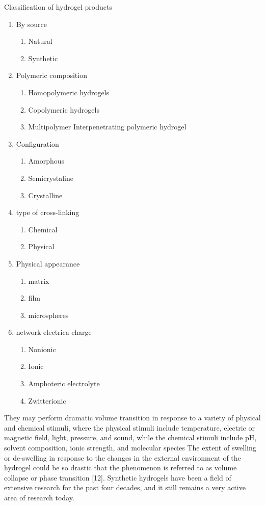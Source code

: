 \documentclass[../../main-notes.tex]{subfiles}
\begin{document}
Classification of hydrogel products 

\begin{enumerate}
    \item By source 
    \begin{enumerate}
        \item Natural
        \item Synthetic
    \end{enumerate}
    \item Polymeric composition
    \begin{enumerate}
        \item Homopolymeric hydrogels 
        \item Copolymeric hydrogels 
        \item Multipolymer Interpenetrating polymeric hydrogel 
    \end{enumerate}
    \item Configuration
    \begin{enumerate}
        \item Amorphous
        \item Semicrystaline 
        \item  Crystalline
    \end{enumerate}
    \item type of cross-linking 
    \begin{enumerate}
        \item Chemical
        \item Physical
    \end{enumerate}
    \item Physical appearance
    \begin{enumerate}
        \item matrix
        \item film
        \item microspheres
    \end{enumerate}
    \item network electrica charge
    \begin{enumerate}
        \item Nonionic
        \item Ionic
        \item Amphoteric electrolyte
        \item Zwitterionic
    \end{enumerate}
\end{enumerate}


They may perform dramatic volume transition in response to a variety of physical and chemical stimuli, where the physical stimuli include temperature, electric or magnetic field, light, pressure, and sound, while the chemical stimuli include pH, solvent composition, ionic strength, and molecular species
The extent of swelling or de-swelling in response to the changes in the external environment of the hydrogel could be so drastic that the phenomenon is referred to as volume collapse or phase transition [12]. Synthetic hydrogels have been a field of extensive research for the past four decades, and it still remains a very active area of research today.
\end{document}
